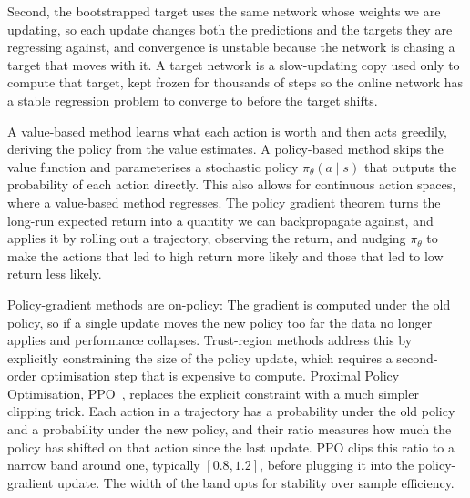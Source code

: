 Second, the bootstrapped target uses the same network whose weights we are updating,
so each update changes both the predictions and the targets they are regressing against,
and convergence is unstable because the network is chasing a target that moves with it.
A target network is a slow-updating copy used only to compute that target,
kept frozen for thousands of steps so the online network has a stable regression problem
to converge to before the target shifts.


A value-based method learns what each action is worth and then acts greedily,
deriving the policy from the value estimates.
A policy-based method skips the value function and parameterises a stochastic policy $\pi_\theta(a \mid s)$
that outputs the probability of each action directly. This also allows for continuous action spaces, 
where a value-based method regresses.
The policy gradient theorem turns the long-run expected return into a quantity we can backpropagate against,
and applies it by rolling out a trajectory, observing the return,
and nudging $\pi_\theta$ to make the actions that led to high return more likely
and those that led to low return less likely.


Policy-gradient methods are on-policy: The gradient is computed under the old policy,
so if a single update moves the new policy too far the data no longer applies
and performance collapses.
Trust-region methods address this by explicitly constraining the size of the policy update,
which requires a second-order optimisation step that is expensive to compute. Proximal Policy Optimisation, PPO~\cite{Schulman2017PPO}, replaces the explicit constraint with a much simpler clipping trick.
Each action in a trajectory has a probability under the old policy and a probability under the new policy,
and their ratio measures how much the policy has shifted on that action since the last update.
PPO clips this ratio to a narrow band around one, typically $[0.8, 1.2]$,
before plugging it into the policy-gradient update.
The width of the band opts for stability over sample efficiency.

